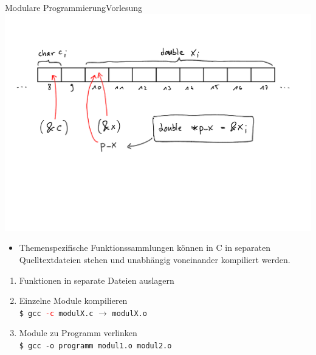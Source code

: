\documentclass[xcolor=dvipsnames]{beamer}
\newcounter{lecturecounter}
\begin{document}
\begin{frame}[fragile]{Modulare Programmierung}{Vorlesung }
\includegraphics[width=\textwidth,page=2,trim=0 10cm 0 2cm,clip=true]{graphics/c_kurs_tafel}
\begin{block}{}
  \begin{itemize}
    \item{Themenspezifische Funktionssammlungen können in C in separaten Quelltextdateien stehen und unabhängig voneinander kompiliert werden.}
  \end{itemize}
\begin{enumerate}
  \item{Funktionen in separate Dateien auslagern}
  \item{Einzelne Module kompilieren \\ \texttt{\$ gcc \textcolor{red}{-c} modulX.c} $\rightarrow$ \texttt{modulX.o}}
  \item{Module zu Programm verlinken \\ \texttt{\$ gcc -o programm modul1.o modul2.o}}
\end{enumerate}
\end{block}
\end{frame}
\end{document}
